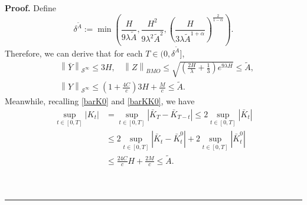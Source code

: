 \documentclass[10pt]{article}%
\numberwithin{equation}{section}
\newenvironment{proof}[1][Proof]{\noindent \textbf{#1.} }{\  \rule{0.5em}{0.5em}}
\begin{document}
\begin{proof}
Define 
$$\delta^{\tilde{A}}:=\min\left(\frac{H}{9\lambda \tilde{A}},\frac{H^2}{9\lambda^2 \tilde{A}^2}, \left(\frac{H}{3\lambda \tilde{A}^{1+\alpha}}\right)^{\frac{2}{1-\alpha}}\right).$$
Therefore, we  can derive that for each $T\in(0,\delta^{\tilde{A}}]$, 
$$
\begin{aligned}
 &\left \| \bar{Y} \right \|_{\mathcal{S}^{\infty}}\leq 3H,\ \ \ \ \left \| Z \right \|_{BMO} \leq \sqrt{\left(\frac{2H}{\lambda}+\frac{1}{3}\right)e^{9\lambda H}}\leq \tilde{A},\\
 &\left \| Y \right \|_{\mathcal{S}^{\infty}}\leq \left(1+\frac{4C}{c}\right)3H+\frac{M}{c}\leq \tilde{A}.
\end{aligned} 
$$
Meanwhile, recalling \eqref{barK0} and \eqref{barKK0}, we have 
$$
\begin{aligned}
 \sup_{t\in[0,T]}\left|K_t\right|&=\sup_{t\in[0,T]}\left|\bar{K}_T-\bar{K}_{T-t}\right|\leq2\sup_{t\in[0,T]}\left|\bar{K}_t\right|\\
 &\leq2\sup_{t \in[0, T]}\left|\bar{K}_{t}-\bar{K}^0_{t}\right|+2\sup_{t \in[0, T]}\left|\bar{K}^0_{t}\right|\\
 &\leq \frac{24C}{c}H+\frac{2M}{c}\leq \tilde{A}.\\   
\end{aligned} 
$$



\end{proof}
\end{document}
